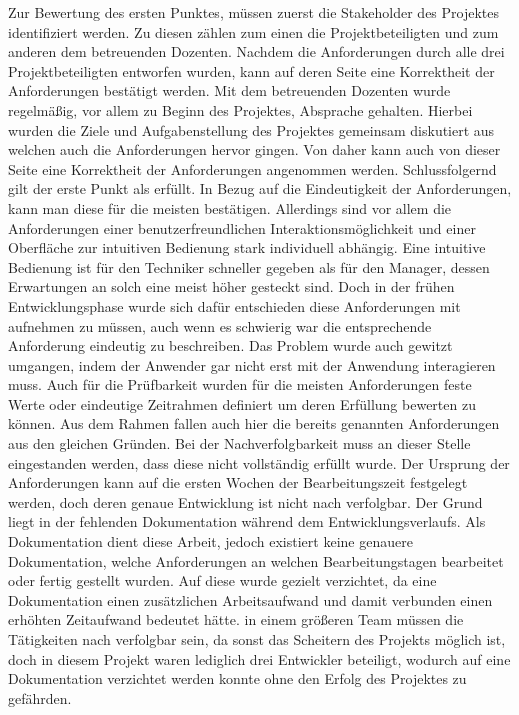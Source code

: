 \documentclass[12pt, a4paper]{report}
\begin{document}
Zur Bewertung des ersten Punktes, müssen zuerst die Stakeholder des Projektes identifiziert werden. Zu diesen zählen zum einen die Projektbeteiligten und zum anderen dem betreuenden Dozenten. Nachdem die Anforderungen durch alle drei Projektbeteiligten entworfen wurden, kann auf deren Seite eine Korrektheit der Anforderungen bestätigt werden. Mit dem betreuenden Dozenten wurde regelmäßig, vor allem zu Beginn des Projektes, Absprache gehalten. Hierbei wurden die Ziele und Aufgabenstellung des Projektes gemeinsam diskutiert aus welchen auch die Anforderungen hervor gingen. Von daher kann auch von dieser Seite eine Korrektheit der Anforderungen angenommen werden. Schlussfolgernd gilt der erste Punkt als erfüllt.
\newline
In Bezug auf die Eindeutigkeit der Anforderungen, kann man diese für die meisten bestätigen. Allerdings sind vor allem die Anforderungen einer benutzerfreundlichen Interaktionsmöglichkeit und einer Oberfläche zur intuitiven Bedienung stark individuell abhängig. Eine intuitive Bedienung ist für den Techniker schneller gegeben als für den Manager, dessen Erwartungen an solch eine meist höher gesteckt sind. Doch in der frühen Entwicklungsphase wurde sich dafür entschieden diese Anforderungen mit aufnehmen zu müssen, auch wenn es schwierig war die entsprechende Anforderung eindeutig zu beschreiben. Das Problem wurde auch gewitzt umgangen, indem der Anwender gar nicht erst mit der Anwendung interagieren muss.
\newline
Auch für die Prüfbarkeit wurden für die meisten Anforderungen feste Werte oder eindeutige Zeitrahmen definiert um deren Erfüllung bewerten zu können. Aus dem Rahmen fallen auch hier die bereits genannten Anforderungen aus den gleichen Gründen. 
\newline
Bei der Nachverfolgbarkeit muss an dieser Stelle eingestanden werden, dass diese nicht vollständig erfüllt wurde. Der Ursprung der Anforderungen kann auf die ersten Wochen der Bearbeitungszeit festgelegt werden, doch deren genaue Entwicklung ist nicht nach verfolgbar. Der Grund liegt in der fehlenden Dokumentation während dem Entwicklungsverlaufs. Als Dokumentation dient diese Arbeit, jedoch existiert keine genauere Dokumentation, welche Anforderungen an welchen Bearbeitungstagen bearbeitet oder fertig gestellt wurden. Auf diese wurde gezielt verzichtet, da eine Dokumentation einen zusätzlichen Arbeitsaufwand und damit verbunden einen erhöhten Zeitaufwand bedeutet hätte. in einem größeren Team müssen die Tätigkeiten nach verfolgbar sein, da sonst das Scheitern des Projekts möglich ist, doch in diesem Projekt waren lediglich drei Entwickler beteiligt, wodurch auf eine Dokumentation verzichtet werden konnte ohne den Erfolg des Projektes zu gefährden.
\end{document}
